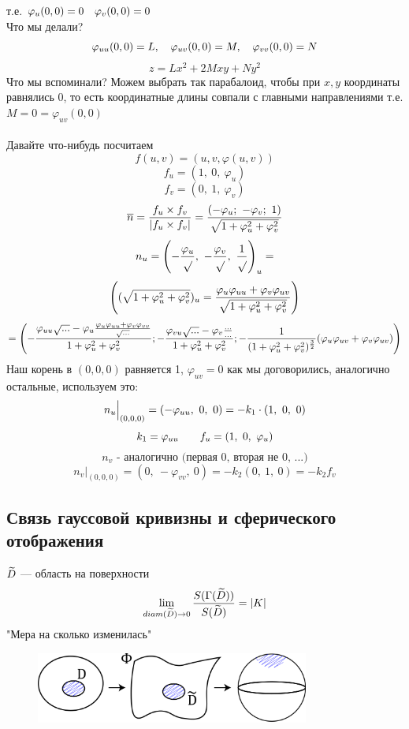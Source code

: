 \documentclass[main]{subriles}
\begin{document}
    т.е. $\varphi_u(0,0) = 0 \quad \varphi_v(0,0) = 0 $\\
    Что мы делали?
    \[\varphi_{uu}(0,0) = L,\quad \varphi_{uv}(0,0) = M,\quad \varphi_{vv}(0,0) = N\]
    \[z = Lx^2 + 2 Mxy + Ny^2\]
    Что мы вспоминали? Можем выбрать так парабалоид, чтобы при $x,y$ координаты равнялись 0, то есть координатные длины совпали с главными направлениями
    т.е. $M = 0 = \varphi_{uv}(0,0)$\\ \ \\
    Давайте что-нибудь посчитаем
    \[f(u,v) = (u,v, \varphi(u,v))\]
    \[f_u = (1,\ 0,\ \varphi_u)\]
    \[f_v = (0,\ 1,\ \varphi_v)\]
    \[\overline{n} = \frac{f_u \times f_v}{|f_u \times f_v|} = \frac{(-\varphi_u;\ -\varphi_v;\ 1)}{\sqrt{1 + \varphi_u^2 + \varphi_v^2}}\]
    \[n_u = \left(- \frac{\varphi_u}{\sqrt{}},\
    - \frac{\varphi_v}{\sqrt{}},\
    \frac{1}{\sqrt{}}\right)_u = \]
    \[\left((\sqrt{1 + \varphi_u^2 + \varphi_v^2})_u =
    \frac{\varphi_u \varphi_{uu} + \varphi_v \varphi_{uv}}{\sqrt{1 + \varphi_u^2 + \varphi_v^2}}\right)\]
    \[= \left(-\frac{\varphi_{uu}\sqrt{...} - \varphi_u \frac{\varphi_u \varphi_{uu} + \varphi_v \varphi_{vv}}{\sqrt{...}}}{1+ \varphi_u^2 + \varphi_v^2};
    - \frac{\varphi_{vu} \sqrt{...} - \varphi_v \frac{...}{...}}{1 + \varphi_u^2 + \varphi_v^2};
    -\frac{1}{(1+ \varphi_u^2 + \varphi_v^2)^{\frac{3}{2}}} (\varphi_u \varphi_{uv} + \varphi_v \varphi_{uv})\right)\]
    Наш корень в $(0,0,0)$ равняется 1, $\varphi_{uv}=0$ как мы договорились, аналогично остальные, используем это:
    \[n_u \Big|_{(0,0,0)} = \left(-\varphi_{uu},\ 0,\ 0\right) = -k_1 \cdot (1,\ 0,\ 0)\]
    \[k_1 = \varphi_{uu} \qquad f_u = (1,\ 0,\ \varphi_u)\]
    \[n_v \text{ - аналогично (первая 0, вторая не 0, ...)}\]
    \[n_v \Big|_{(0,0,0)} = (0,\ -\varphi_{vv},\ 0) = -k_2 (0,\ 1,\ 0) = -k_2 f_v\]

    \subsection{Связь гауссовой кривизны и сферического отображения}
    \begin{theorem}
        $\widetilde{D}$ --- область на поверхности
        \[\lim_{diam(\widetilde{D}) \rightarrow 0}\frac{S(\Gamma(\widetilde{D}))}{S(\widetilde{D})} = |K|\]
        "Мера на сколько изменилась"{}
        \begin{figure}[H]
            \includegraphics[width=9cm]{pics/10_5.png}
            \centering
        \end{figure}

    \end{theorem}
\end{document}
